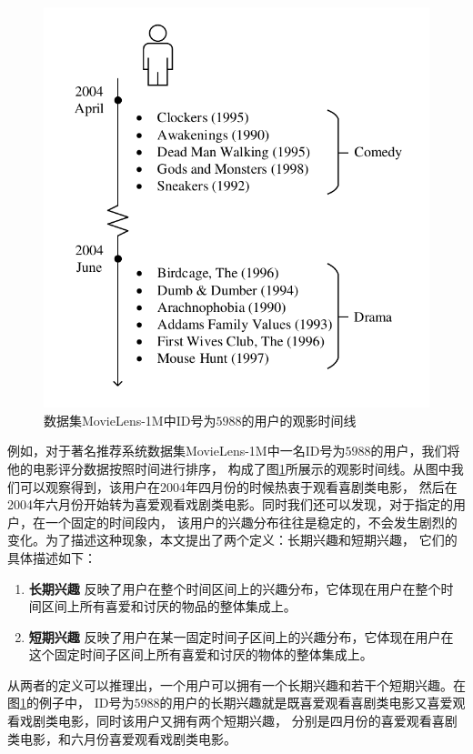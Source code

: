 \begin{figure}[htbp]
\centering
\includegraphics[scale=0.7]{images/example.pdf}
\caption{数据集MovieLens-1M中ID号为$5988$的用户的观影时间线}
\label{fig:example}
\end{figure}

例如，对于著名推荐系统数据集MovieLens-1M中一名ID号为$5988$的用户，我们将他的电影评分数据按照时间进行排序，
构成了图\ref{fig:example}所展示的观影时间线。从图中我们可以观察得到，该用户在2004年四月份的时候热衷于观看喜剧类电影，
然后在2004年六月份开始转为喜爱观看戏剧类电影。同时我们还可以发现，对于指定的用户，在一个固定的时间段内，
该用户的兴趣分布往往是稳定的，不会发生剧烈的变化。为了描述这种现象，本文提出了两个定义：长期兴趣和短期兴趣，
它们的具体描述如下：

\begin{enumerate}
\item \textbf{长期兴趣} 反映了用户在整个时间区间上的兴趣分布，它体现在用户在整个时间区间上所有喜爱和讨厌的物品的整体集成上。
\item \textbf{短期兴趣} 反映了用户在某一固定时间子区间上的兴趣分布，它体现在用户在这个固定时间子区间上所有喜爱和讨厌的物体的整体集成上。
\end{enumerate}

从两者的定义可以推理出，一个用户可以拥有一个长期兴趣和若干个短期兴趣。在图\ref{fig:example}的例子中，
ID号为$5988$的用户的长期兴趣就是既喜爱观看喜剧类电影又喜爱观看戏剧类电影，同时该用户又拥有两个短期兴趣，
分别是四月份的喜爱观看喜剧类电影，和六月份喜爱观看戏剧类电影。

